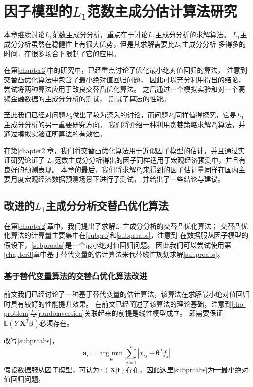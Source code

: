 \section{因子模型的$L_1$范数主成分估计算法研究}

本章继续讨论$L_1$范数主成分分析，重点在于讨论$L_1$主成分分析的求解算法。
$L_1$主成分分析虽然在稳健性上有很大优势，但是其求解需要比$L_2$主成分分析
多得多的时间，在很多场合下限制了它的应用。

在第\ref{chapter3}中的研究中，已经重点讨论了优化最小绝对值回归的算法，
注意到交替凸优化算法中包含了最小绝对值回归问题，
因此可以充分利用得出的结论，尝试将两种算法应用于改良交替凸优化算法。
之后通过一个模拟实验和对一个高频金融数据的主成分分析的测试，
测试了算法的性能。

至此我们已经对问题$P_3$做出了较为深入的讨论，而问题$P_4$同样值得探究，它是$L_1$主成分分析的另一重要研究方向。
我们将介绍一种利用贪婪策略求解$P_4$算法，并通过模拟实验证明算法的有效性。

在第\ref{chapter2}章，我们将交替凸优化算法用于近似因子模型的估计，并且通过实证研究论证了
$L_1$范数主成分分析得出的因子同样适用于宏观经济预测中，并且有良好的预测表现。
本章的最后，我们将求解$P_4$来得到的因子估计量同样在国内主要月度宏观经济数据预测场景下进行了测试，
并给出了一些结论与建议。

\subsection{改进的$L_1$主成分分析交替凸优化算法}
在第\ref{chapter2}章中，我们提出了求解$L_1$主成分分析的交替凸优化算法；
交替凸优化算法的计算量主要集中在\eqref{subpro}和\eqref{subproabs}，注意到
在数据服从因子模型的假设下，\eqref{subproabs}是一个最小绝对值回归问题。
因此我们可以尝试使用第\ref{chapter3}章中基于替代变量的估计算法来代替线性规划求解\eqref{subproabs}。

\subsubsection{基于替代变量算法的交替凸优化算法改进}
前文我们已经讨论了一种基于替代变量的估计算法，该算法在求解最小绝对值回归时具有较好的性能提升效果。
在前文已经阐述了该算法的理论基础，注意到\eqref{rho-problem}与\eqref{randomversion}关联起来的前提是线性模型成立。
即需要保证$\mathbb E(Y|\bm{X}^T\bm{\beta})$必须存在。

改写\eqref{subproabs}，
\begin{equation}
    \bm a_i = \underset{\bm {\theta}}{\operatorname{arg\ min}} \sum_{j=1}^n |x_{ij} -\bm{\theta}^Tf_j|
\end{equation}
假设数据服从因子模型，可认为$\mathbb E (\bm X|\bm{f})$存在，因此这里\eqref{subproabs}为一最小绝对值回归问题。

